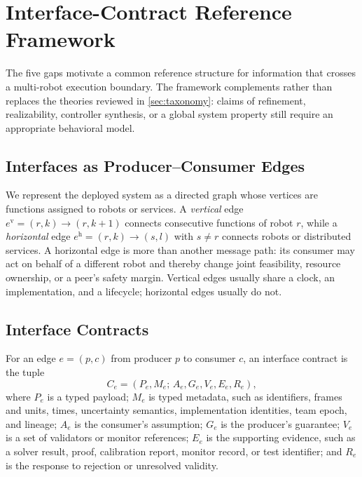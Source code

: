 \section{Interface-Contract Reference Framework}
\label{sec:framework}

The five gaps motivate a common reference structure for information that
crosses a multi-robot execution boundary.  The framework complements rather than
replaces the theories reviewed in \cref{sec:taxonomy}: claims of refinement,
realizability, controller synthesis, or a global system property still require
an appropriate behavioral model.



\subsection{Interfaces as Producer--Consumer Edges}

We represent the deployed system as a directed graph whose vertices are
functions assigned to robots or services.  A \emph{vertical} edge
$e^{\mathrm v}=(r,k)\rightarrow(r,k+1)$ connects consecutive functions of robot
$r$, while a \emph{horizontal} edge $e^{\mathrm h}=(r,k)\rightarrow(s,l)$ with
$s\neq r$ connects robots or distributed services.  A horizontal edge is more
than another message path: its consumer may act on behalf of a different robot
and thereby change joint feasibility, resource ownership, or a peer's safety
margin.  Vertical edges usually share a clock, an implementation, and a
lifecycle; horizontal edges usually do not.

\subsection{Interface Contracts}

\begin{definition}\label{def:interface-contract}
For an edge $e=(p,c)$ from producer $p$ to consumer $c$, an interface contract
is the tuple
\begin{equation}
  C_e=(P_e,M_e;\,A_e,G_e,V_e,E_e,R_e),
  \label{eq:contract}
\end{equation}
where $P_e$ is a typed payload; $M_e$ is typed metadata, such as identifiers,
frames and units, times, uncertainty semantics, implementation identities, team
epoch, and lineage; $A_e$ is the consumer's assumption; $G_e$ is the producer's
guarantee; $V_e$ is a set of validators or monitor references; $E_e$ is the
supporting evidence, such as a solver result, proof, calibration report, monitor
record, or test identifier; and $R_e$ is the response to rejection or unresolved
validity.
\end{definition}

